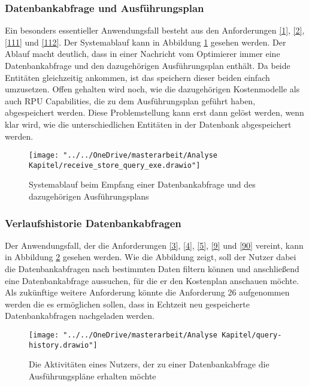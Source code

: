 \subsubsection{Datenbankabfrage und Ausführungsplan}
\label{Datenbankabfrage und Ausführungsplan}
Ein besonders essentieller Anwendungsfall besteht aus den Anforderungen \ref{1}, \ref{2}, \ref{111} und \ref{112}.
Der Systemablauf kann in Abbildung \ref{fig:receivestorequeryexe} gesehen werden.
Der Ablauf macht deutlich, dass in einer Nachricht vom Optimierer immer eine  Datenbankabfrage und den dazugehörigen Ausführungsplan enthält. Da beide Entitäten gleichzeitig ankommen, ist das speichern dieser beiden einfach umzusetzen.
Offen gehalten wird noch, wie die dazugehörigen Kostenmodelle als auch RPU Capabilities, die zu dem Ausführungsplan geführt haben, abgespeichert werden. Diese Problemstellung kann erst dann gelöst werden, wenn klar wird, wie die unterschiedlichen Entitäten in der Datenbank abgespeichert werden. 
\begin{figure}[h!]
	\centering
	\texttt{[image: "../../OneDrive/masterarbeit/Analyse Kapitel/receive\_store\_query\_exe.drawio"]}
	\caption{Systemablauf beim Empfang einer Datenbankabfrage und des dazugehörigen Ausführungsplans}
	\label{fig:receivestorequeryexe}
\end{figure}
\newpage
\subsubsection{Verlaufshistorie Datenbankabfragen}\label{verlauf}
Der Anwendungsfall, der die Anforderungen \ref{3}, \ref{4}, \ref{5}, \ref{9} und \ref{90} vereint, kann in Abbildung \ref{fig:query-history} gesehen werden. Wie die Abbildung zeigt, soll der Nutzer dabei die Datenbankabfragen nach bestimmten Daten filtern können und anschließend eine Datenbankabfrage aussuchen, für die er den Kostenplan anschauen möchte. Als zukünftige weitere Anforderung könnte die Anforderung 26 aufgenommen werden die es ermöglichen sollen, dass in Echtzeit neu gespeicherte Datenbankabfragen nachgeladen werden.





\begin{figure}[h!]
	\centering
	\texttt{[image: "../../OneDrive/masterarbeit/Analyse Kapitel/query-history.drawio"]}
	\caption{Die Aktivitäten eines Nutzers, der zu einer Datenbankabfrage die Ausführungspläne erhalten möchte}
	\label{fig:query-history}
\end{figure}

